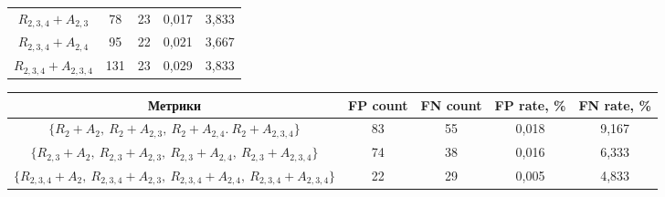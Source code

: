 \begin{multicols}{2}
\begin{table}[b]
\begin{center}
\begin{tabular}{|c|c|c|c|c|}
$R_{2,3,4} + A_{2,3}$ & \hphantom{9}78 & 23& 0,017& 3,833\\ 

$R_{2,3,4} + A_{2,4}$ &  \hphantom{9}95& 22 & 0,021& 3,667\\ 

$R_{2,3,4} + A_{2,3,4}$ & 131& 23& 0,029& 3,833\\

        \hline

    \end{tabular}

    \end{center}





\begin{center}


    \label{res_seq}

    \vspace*{2ex}

    


    \begin{tabular}{|c|c|c|c|c|}

                    \hline

                    Метрики& FP count& FN count & FP rate, \% & FN rate, \%\\

                    \hline

$\{R_2 + A_2,\ R_2+A_{2,3}, \ R_2+A_{2,4}.\ R_2+A_{2,3,4}\}$ & 83 & 55 & 0,018& 9,167\\

$\{R_{2,3} + A_2,\ R_{2,3}+A_{2,3},\ R_{2,3}+A_{2,4},\ R_{2,3}+A_{2,3,4}\}$ &

74& 38& 0,016& 6,333\\

 $\{R_{2,3,4} + A_2,\ R_{2,3,4} + A_{2,3},\ R_{2,3,4} + A_{2,4},\

R_{2,3,4} + A_{2,3,4}\}$ & 22& 29& 0,005& 4,833\\

        \hline

    \end{tabular}

    \end{center}


\end{table}
\end{multicols}

